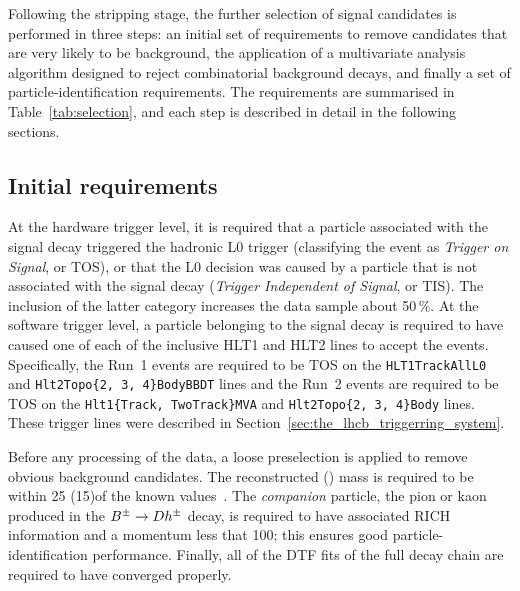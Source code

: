 Following the stripping stage, the further selection of signal candidates is performed in three steps: an initial set of requirements to remove candidates that are very likely to be background, the application of a multivariate analysis algorithm designed to reject combinatorial background decays, and finally a set of particle-identification requirements. The requirements are summarised in Table~\ref{tab:selection}, and each step is described in detail in the following sections.



\subsection{Initial requirements} %
\label{sub:initial_requirements}

At the hardware trigger level, it is required that a particle associated with the signal decay triggered the hadronic L0 trigger (classifying the event as \emph{Trigger on Signal}, or TOS), or that the L0 decision was caused by a particle that is not associated with the signal decay (\emph{Trigger Independent of Signal}, or TIS). The inclusion of the latter category increases the data sample about 50\,\%. At the software trigger level, a particle belonging to the signal decay is required to have caused one of each of the inclusive HLT1 and HLT2 lines to accept the events. Specifically, the Run~1 events are required to be TOS on the \texttt{HLT1TrackAllL0} and \texttt{Hlt2Topo\{2, 3, 4\}BodyBBDT} lines and the Run~2 events are required to be TOS on the \texttt{Hlt1\{Track,\,TwoTrack\}MVA} and \texttt{Hlt2Topo\{2, 3, 4\}Body}  lines. These trigger lines were described in Section~\ref{sec:the_lhcb_triggerring_system}.

Before any processing of the data, a loose preselection is applied to remove obvious background candidates. The reconstructed \D (\KS) mass is required to be within 25 (15)\mevcc of the known values~\cite{PDG2020}. The \emph{companion} particle, the pion or kaon produced in the ${{B}^\pm}\rightarrow{\ensuremath{D}} h^\pm$ decay, is required to have associated RICH information and a momentum less that 100\gevc; this ensures good particle-identification performance. Finally, all of the DTF fits of the full decay chain are required to have converged properly.

